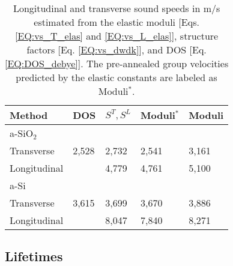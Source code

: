 \documentclass[aps,prb,twocolumn,superscriptaddress,footinbib,amsmath,amssymb,floatfix]{revtex4}
\begin{document}
\begin{center}
\begingroup
\begin{table}
\caption{\label{T:vs}
Longitudinal and transverse sound speeds in m/s estimated from the 
elastic moduli [Eqs. \eqref{EQ:vs_T_elas} and \eqref{EQ:vs_L_elas}], 
structure factors [Eq. \eqref{EQ:vs_dwdk}], and 
DOS [Eq. \eqref{EQ:DOS_debye}]. The pre-annealed group velocities 
predicted by the elastic constants are labeled as Moduli$^*$.}
\begin{tabular}{lllll}
\hline \hline
Method & DOS & $S^{T}, S^{L}$ & Moduli$^*$ & Moduli \\
\hline
a-SiO$_2$ \\
\hline
Transverse & 2,528 & 2,732 & 2,541 & 3,161 \\
Longitudinal &  & 4,779 & 4,761 & 5,100 \\
\hline
a-Si \\
\hline
Transverse & 3,615 & 3,699 & 3,670 & 3,886 \\
Longitudinal &  & 8,047 & 7,840 & 8,271 \\
\hline \hline
\end{tabular}
\end{table}
\endgroup
\end{center}

\subsection{\label{S:Life}Lifetimes}
\end{document}
